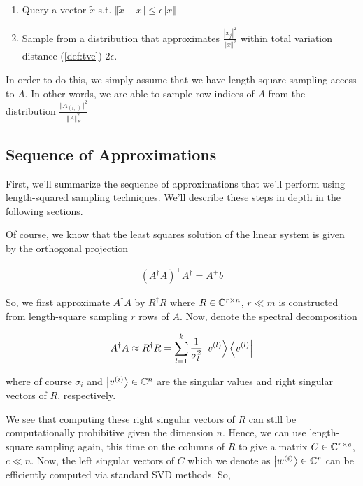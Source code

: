 \documentclass[main.tex]{subfiles}
\begin{document}
\begin{enumerate}
\item Query a vector $\tilde{x}$ s.t. $\Vert \tilde{x} - x \Vert \leq \epsilon \Vert x \Vert$
\item Sample from a distribution that approximates $\frac{|x_j|^2}{\Vert x \Vert^2}$ within total variation distance (\autoref{def:tve}) $2\epsilon$.
\end{enumerate}

In order to do this, we simply assume that we have length-square sampling access to $A$. In other words, we are able to sample row indices of $A$ from the distribution $\frac{\Vert A_{(i, \cdot)}\Vert^2}{\Vert A \Vert^2_F}$

\subsection{Sequence of Approximations}

First, we'll summarize the sequence of approximations that we'll perform using length-squared sampling techniques. We'll describe these steps in depth in the following sections.

Of course, we know that the least squares solution of the linear system is given by the orthogonal projection

\begin{align*}
	(A^\dag A)^+ A^\dag = A^+ b
\end{align*}

So, we first approximate $A^\dag A$ by $R^\dag R$ where $R \in \mathbb{C}^{r \times n}$, $r \ll m$ is constructed from length-square sampling $r$ rows of $A$. Now, denote the spectral decomposition 

\begin{align*}
A^\dag A \approx R^\dag R = \sum_{l=1}^k \frac{1}{\sigma_l^2}\ket{v^{(l)}}\bra{v^{(l)}}
\end{align*}

where of course $\sigma_i$ and $\ket{v^{(i)}} \in \mathbb{C}^n$ are the singular values and right singular vectors of $R$, respectively.

We see that computing these right singular vectors of $R$ can still be computationally prohibitive given the dimension $n$. Hence, we can use length-square sampling again, this time on the columns of $R$ to give a matrix $C \in \mathbb{C}^{r \times c}$, $c \ll n$. Now, the left singular vectors of $C$ which we denote as $\ket{w^{(i)}} \in \mathbb{C}^r$ can be efficiently computed via standard SVD methods. So,
\end{document}
